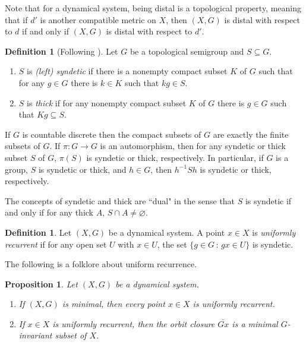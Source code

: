 \documentclass[11pt]{amsart}
\newtheorem{proposition}[theorem]{Proposition}
\theoremstyle{definition}
\newtheorem{definition}[theorem]{Definition}
\numberwithin{equation}{section}
\theoremstyle{definition}
\begin{document}
Note that for a dynamical system, being distal is a topological property, meaning that if $d'$ is another compatible metric on $X$, then $(X, G)$ is distal with respect to $d$ if and only if $(X,G)$ is distal with respect to $d'$.


\begin{definition}[Following \cite{DLX}] Let $G$ be a topological semigroup and $S\subseteq G$.
\begin{enumerate}
\item $S$ is {\em (left) syndetic} if there is a nonempty compact subset $K$ of $G$ such that for any $g\in G$ there is $k\in K$ such that $kg\in S$.
\item $S$ is {\em thick} if for any nonempty compact subset $K$ of $G$ there is $g\in G$ such that $Kg\subseteq S$.
\end{enumerate}
\end{definition}

If $G$ is countable discrete then the compact subsets of $G$ are exactly the finite subsets of $G$. If $\pi: G\to G$ is an automorphism, then for any syndetic or thick subset $S$ of $G$, $\pi(S)$ is syndetic or thick, respectively. In particular, if $G$ is a group, $S$ is syndetic or thick, and $h\in G$, then $h^{-1}Sh$ is syndetic or thick, respectively.

The concepts of syndetic and thick are ``dual" in the sense that $S$ is syndetic if and only if for any thick $A$, $S\cap A\neq\varnothing$.

\begin{definition} Let $(X, G)$ be a dynamical system. A point $x\in X$ is {\em uniformly recurrent} if for any open set $U$ with $x\in U$, the set $\{g\in G\,:\, gx\in U\}$ is syndetic.
\end{definition}

The following is a folklore about uniform recurrence.

\begin{proposition}\label{P-minimal vs uniformly recurrent} Let $(X, G)$ be a dynamical system.
\begin{enumerate}
\item If $(X, G)$ is minimal, then every point $x\in X$ is uniformly recurrent.
\item If $x\in X$ is uniformly recurrent, then the orbit closure $\overline{Gx}$ is a minimal $G$-invariant subset of $X$.
\end{enumerate}
\end{proposition}
\end{document}
